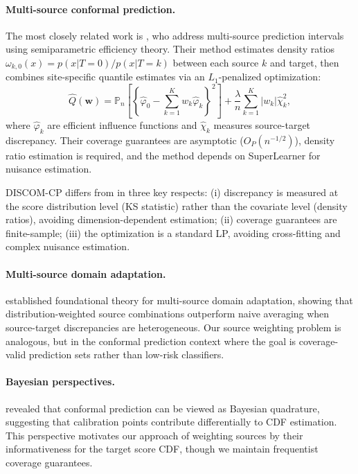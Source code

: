 \documentclass{article}
\newcommand{\DISCOM}{\textsc{DISCOM-CP}}
\begin{document}
\paragraph{Multi-source conformal prediction.}
The most closely related work is \citet{liu2024multi}, who address multi-source prediction intervals using semiparametric efficiency theory. Their method estimates density ratios $\omega_{k,0}(x) = p(x|T=0)/p(x|T=k)$ between each source $k$ and target, then combines site-specific quantile estimates via an $L_1$-penalized optimization:
\begin{equation}
\hat{Q}(\mathbf{w}) = \mathbb{P}_n\left[\left\{\hat{\varphi}_0 - \sum_{k=1}^{K} w_k \hat{\varphi}_k\right\}^2\right] + \frac{\lambda}{n} \sum_{k=1}^K |w_k| \hat{\chi}_k^2,
\end{equation}
where $\hat{\varphi}_k$ are efficient influence functions and $\hat{\chi}_k$ measures source-target discrepancy. Their coverage guarantees are asymptotic ($O_P(n^{-1/2})$), density ratio estimation is required, and the method depends on SuperLearner for nuisance estimation.

\DISCOM{} differs from \citet{liu2024multi} in three key respects: (i) discrepancy is measured at the score distribution level (KS statistic) rather than the covariate level (density ratios), avoiding dimension-dependent estimation; (ii) coverage guarantees are finite-sample; (iii) the optimization is a standard LP, avoiding cross-fitting and complex nuisance estimation.

\paragraph{Multi-source domain adaptation.}
\citet{mansour2009domain} established foundational theory for multi-source domain adaptation, showing that distribution-weighted source combinations outperform naive averaging when source-target discrepancies are heterogeneous. Our source weighting problem is analogous, but in the conformal prediction context where the goal is coverage-valid prediction sets rather than low-risk classifiers.

\paragraph{Bayesian perspectives.}
\citet{snell2025conformal} revealed that conformal prediction can be viewed as Bayesian quadrature, suggesting that calibration points contribute differentially to CDF estimation. This perspective motivates our approach of weighting sources by their informativeness for the target score CDF, though we maintain frequentist coverage guarantees.
\end{document}
